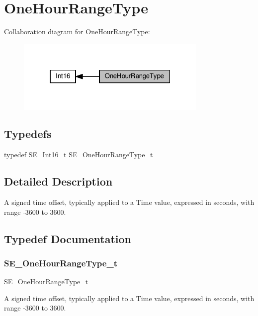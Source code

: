 \hypertarget{group__OneHourRangeType}{}\section{One\+Hour\+Range\+Type}
\label{group__OneHourRangeType}
Collaboration diagram for One\+Hour\+Range\+Type\+:\nopagebreak
\begin{figure}[H]
\begin{center}
\leavevmode
\includegraphics[width=260pt]{group__OneHourRangeType}
\end{center}
\end{figure}
\subsection*{Typedefs}
\begin{DoxyCompactItemize}
\item 
typedef \hyperlink{group__Int16_ga0d600c7df811a7d4b4816e8965877690}{S\+E\+\_\+\+Int16\+\_\+t} \hyperlink{group__OneHourRangeType_ga2b9c57435b20a5fc0689922b77e97c2d}{S\+E\+\_\+\+One\+Hour\+Range\+Type\+\_\+t}
\end{DoxyCompactItemize}


\subsection{Detailed Description}
A signed time offset, typically applied to a Time value, expressed in seconds, with range -\/3600 to 3600. 

\subsection{Typedef Documentation}
\mbox{\label{group__OneHourRangeType_ga2b9c57435b20a5fc0689922b77e97c2d}} 
\subsubsection{\texorpdfstring{S\+E\+\_\+\+One\+Hour\+Range\+Type\+\_\+t}{SE\_OneHourRangeType\_t}}
{\footnotesize\ttfamily \hyperlink{group__OneHourRangeType_ga2b9c57435b20a5fc0689922b77e97c2d}{S\+E\+\_\+\+One\+Hour\+Range\+Type\+\_\+t}}

A signed time offset, typically applied to a Time value, expressed in seconds, with range -\/3600 to 3600. 